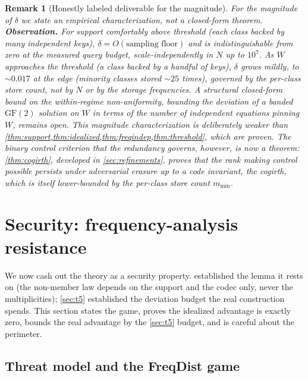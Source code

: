\documentclass[sigconf,nonacm,anonymous,balance=false]{acmart}
\newtheorem{remark}{Remark}
\newcommand{\GF}{\mathrm{GF}(2)}
\newcommand{\W}{W}                          %
\begin{document}
\begin{remark}[Honestly labeled deliverable for the magnitude]
\label{rem:t5-bound}
For the \emph{magnitude} of $\delta$ we state an empirical characterization, not a
closed-form theorem. \textbf{Observation.} For support comfortably above threshold (each
class backed by many independent keys), $\delta = O(\text{sampling floor})$ and is
indistinguishable from zero at the measured query budget, scale-independently in $N$ up to
$10^7$. As $\W$ approaches the threshold (a class backed by a handful of keys), $\delta$
grows mildly, to $\sim 0.017$ at the edge (minority classes stored $\sim 25$ times),
governed by the per-class store count, not by $N$ or by the storage frequencies. A
structural closed-form bound on the within-regime non-uniformity, bounding the deviation of
a banded $\GF$ solution on $\W$ in terms of the number of independent equations pinning
$\W$, remains open. This magnitude characterization is deliberately weaker than
\cref{thm:support,thm:idealized,thm:freqindep,thm:threshold}, which are proven. The
\emph{binary control criterion} that the redundancy governs, however, is now a theorem:
\cref{thm:cogirth}, developed in \cref{sec:refinements}, proves that the rank making control possible persists under
adversarial erasure up to a code invariant, the cogirth, which is itself lower-bounded by
the per-class store count $m_{\min}$.
\end{remark}

\section{Security: frequency-analysis resistance}
\label{sec:security}

We now cash out the theory as a security property.  established the
lemma it rests on (the non-member law depends on the support and the codec only, never
the multiplicities); \cref{sec:t5} established the deviation budget the real construction
spends. This section states the game, proves the idealized advantage is exactly zero,
bounds the real advantage by the \cref{sec:t5} budget, and is careful about the
perimeter.

\subsection{Threat model and the FreqDist game}
\end{document}
